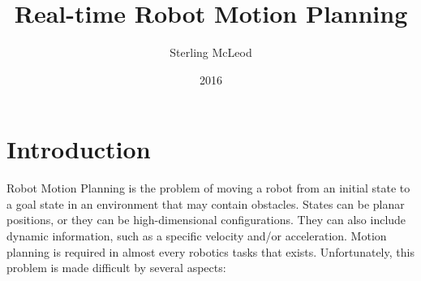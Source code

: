 \documentclass[10pt,conference]{ieeeconf}
\begin{document}





\author{Sterling McLeod}
\title {Real-time Robot Motion Planning}
\date {2016}

\maketitle

\renewcommand{\algorithmicforall}{\textbf{for each}}

\section{Introduction}

	Robot Motion Planning is the problem of moving a robot from an initial state to a goal state in an environment that may contain obstacles. States can be planar positions, or they can be high-dimensional configurations. They can also include dynamic information, such as a specific velocity and/or acceleration.	Motion planning is required in almost every robotics tasks that exists. Unfortunately, this problem is made difficult by several aspects: 
	
\end{document}
